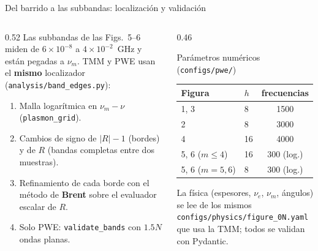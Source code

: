 \documentclass[aspectratio=169,10pt]{beamer}
\newcommand{\nue}{\nu_e}
\newcommand{\num}{\nu_m}
\begin{document}
\begin{frame}{Del barrido a las subbandas: localización y validación}
  \begin{columns}[T]
    \begin{column}{0.52\textwidth}
      \small
      Las subbandas de las Figs.~5--6 miden de $6\times10^{-8}$ a $4\times10^{-2}$~GHz y están pegadas a
      $\num$. TMM y PWE usan el \textbf{mismo} localizador (\texttt{analysis/band\_edges.py}):
      \begin{enumerate}
        \item Malla logarítmica en $\num-\nu$ (\texttt{plasmon\_grid}).
        \item Cambios de signo de $|R|-1$ (bordes) y de $R$ (bandas completas entre dos muestras).
        \item Refinamiento de cada borde con el método de \textbf{Brent} sobre el evaluador escalar de $R$.
        \item Solo PWE: \texttt{validate\_bands} con $1.5N$ ondas planas.
      \end{enumerate}
    \end{column}
    \begin{column}{0.46\textwidth}
      \begin{block}{Parámetros numéricos (\texttt{configs/pwe/})}
        \footnotesize
        \begin{tabular}{llc}
          \toprule
          Figura & $h$ & frecuencias \\
          \midrule
          1, 3 & 8 & 1500 \\
          2 & 8 & 3000 \\
          4 & 16 & 4000 \\
          5, 6 ($m\le4$) & 16 & 300 (log.) \\
          5, 6 ($m=5,6$) & 8 & 300 (log.) \\
          \bottomrule
        \end{tabular}
      \end{block}
      \small La física (espesores, $\nue$, $\num$, ángulos) se lee de los mismos
      \texttt{configs/physics/figure\_0N.yaml} que usa la TMM; todos se validan con Pydantic.
    \end{column}
  \end{columns}
\end{frame}
\end{document}
